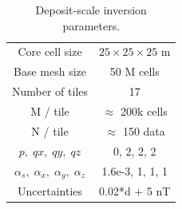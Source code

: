 \begin{table}
\centering
\caption{Deposit-scale inversion parameters.}
\label{tbl:Dep_inv}
\renewcommand{\arraystretch}{1.2}
\begin{tabular}{|c|c|}\hline
Core cell size & $25\times25\times25$ m \\
Base mesh size & 50 M cells \\
Number of tiles & 17 \\
M / tile & $\approx$ 200k cells \\
N / tile & $\approx$ 150 data \\
$p,\;qx,\;qy,\;qz$ & 0, 2, 2, 2 \\
$\alpha_s,\; \alpha_x,\; \alpha_y, \; \alpha_z$ & 1.6e-3, 1, 1, 1 \\
Uncertainties & 0.02*d + 5 nT \\ \hline
\end{tabular}
\end{table}
